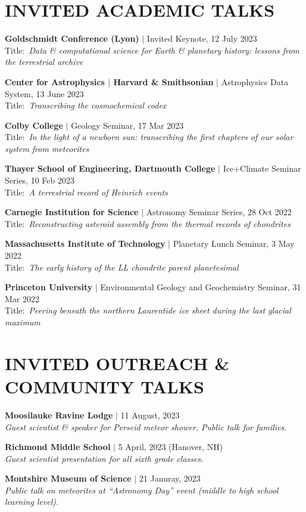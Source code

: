 \newcommand{\invitedtalk}[3]{\textbf{#1} $|$ {#2} \\ Title:~\textit{#3}}
\newcommand{\outreachtalk}[3]{\textbf{#1} $|$ {#2} \\ \quad \textit{#3}}
\section*{INVITED ACADEMIC TALKS}

\begin{etaremune} [itemsep=4pt, leftmargin=3ex,]
  \item \invitedtalk{Goldschmidt Conference (Lyon)}{Invited Keynote, 12 July 2023}{Data \& computational science for Earth \& planetary history: lessons from the terrestrial archive}
  \item \invitedtalk{Center for Astrophysics $|$ Harvard \& Smithsonian }{Astrophysics Data System, 13 June 2023}{Transcribing the cosmochemical codex}
  \item \invitedtalk{Colby College}{Geology Seminar, 17 Mar 2023}{In the light of a newborn sun: transcribing the first chapters of our solar system from meteorites}
  \item \invitedtalk{Thayer School of Engineering, Dartmouth College}{Ice+Climate Seminar Series, 10 Feb 2023}{A terrestrial record of Heinrich events}
  \item \invitedtalk{Carnegie Institution for Science}{Astronomy Seminar Series, 28 Oct 2022}{Reconstructing asteroid assembly from the thermal records of chondrites}
  \item \invitedtalk{Massachusetts Institute of Technology}{Planetary Lunch Seminar, 3 May 2022}{The early history of the LL chondrite parent planetesimal}
  \item \invitedtalk{Princeton University}{Environmental Geology and Geochemistry Seminar, 31 Mar 2022}{Peering beneath the northern Laurentide ice sheet during the last glacial maximum}
  
\end{etaremune}

\section*{INVITED OUTREACH \& COMMUNITY TALKS}

\begin{etaremune} [itemsep=4pt, leftmargin=3ex,]
  
  \item \outreachtalk{Moosilauke Ravine Lodge}{11 August, 2023}{Guest scientist \& speaker for Perseid meteor shower. Public talk for families.}  
  
  \item \outreachtalk{Richmond Middle School}{5 April, 2023 (Hanover, NH)}{Guest scientist presentation for all sixth grade classes.}
  
  \item \outreachtalk{Montshire Museum of Science}{21 Januray, 2023}{Public talk on meteorites at ``Astronomy Day'' event (middle to high school learning level).}
\end{etaremune}